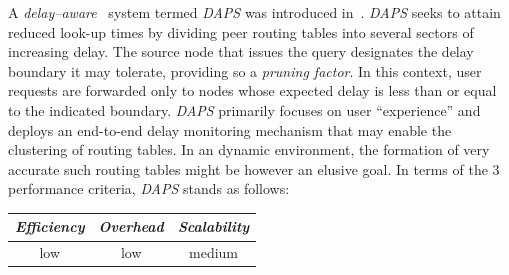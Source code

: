 A \emph{delay--aware} \p\ system termed {\sl DAPS} 
was introduced in~\cite{ZL2005}.
{\sl DAPS}  seeks to attain reduced look-up times by dividing 
peer routing tables into several sectors of increasing delay. 
The source node that issues the query designates the delay 
boundary it may tolerate, providing so a \emph{pruning factor}.
In this context, user requests are forwarded only to 
nodes whose expected delay is less than or equal to the indicated boundary. 
{\sl DAPS} primarily focuses on user ``experience'' and deploys an
end-to-end delay monitoring mechanism that may enable
the clustering of routing tables. 
In an dynamic environment, the formation 
of very accurate such routing tables might be however an elusive goal.
In terms of the $3$ performance criteria, {\sl DAPS} stands as follows:
\begin{center}
{\footnotesize
\begin{tabular}{ccc}
\emph{Efficiency} & \emph{Overhead} & \emph{Scalability} \\
\hline
low &
low &
%
medium
\end{tabular}
}
\end{center}

